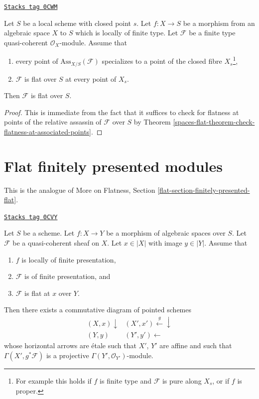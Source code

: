 \begin{lemma}
\label{spaces-flat-lemma-check-along-closed-fibre}
\href{https://stacks.math.columbia.edu/tag/0CWM}{\texttt{Stacks tag 0CWM}}

Let $S$ be a local scheme with closed point $s$.
Let $f : X \to S$ be a morphism from an algebraic space $X$ to $S$
which is locally of finite type.
Let $\mathcal{F}$ be a finite type quasi-coherent $\mathcal{O}_X$-module.
Assume that
\begin{enumerate}
\item every point of $\text{Ass}_{X/S}(\mathcal{F})$ specializes
to a point of the closed fibre $X_s$\footnote{For example this holds if
$f$ is finite type and $\mathcal{F}$ is pure along $X_s$, or
if $f$ is proper.},
\item $\mathcal{F}$ is flat over $S$ at every point of $X_s$.
\end{enumerate}
Then $\mathcal{F}$ is flat over $S$.
\end{lemma}

\begin{proof}
This is immediate from the fact that it suffices to check for
flatness at points of the relative assassin of $\mathcal{F}$
over $S$ by
Theorem \ref{spaces-flat-theorem-check-flatness-at-associated-points}.
\end{proof}

\section{Flat finitely presented modules}
\label{spaces-flat-section-finitely-presented-flat}
This is the analogue of More on Flatness, Section
\ref{flat-section-finitely-presented-flat}.

\begin{proposition}
\label{spaces-flat-proposition-finite-presentation-flat-at-point}
\href{https://stacks.math.columbia.edu/tag/0CVY}{\texttt{Stacks tag 0CVY}}

Let $S$ be a scheme.
Let $f : X \to Y$ be a morphism of algebraic spaces over $S$.
Let $\mathcal{F}$ be a quasi-coherent sheaf on $X$.
Let $x \in |X|$ with image $y \in |Y|$.
Assume that
\begin{enumerate}
\item $f$ is locally of finite presentation,
\item $\mathcal{F}$ is of finite presentation, and
\item $\mathcal{F}$ is flat at $x$ over $Y$.
\end{enumerate}
Then there exists a commutative diagram of pointed schemes
$$
\begin{array}{cc}(X, x) \downarrow & (X', x') \overset{g}{\longleftarrow}\downarrow \\ (Y, y) & (Y', y') \longleftarrow\end{array}
$$
whose horizontal arrows are \'etale such that $X'$, $Y'$
are affine and such that
$\Gamma(X', g^*\mathcal{F})$ is a projective
$\Gamma(Y', \mathcal{O}_{Y'})$-module.
\end{proposition}

